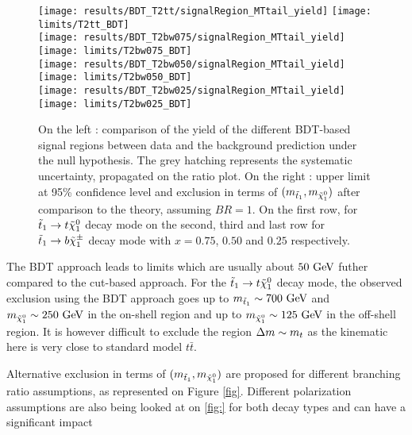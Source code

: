     \begin{figure}[h!]
        \centering
        \texttt{[image: results/BDT\_T2tt/signalRegion\_MTtail\_yield]}
        \texttt{[image: limits/T2tt\_BDT]}\\
        \texttt{[image: results/BDT\_T2bw075/signalRegion\_MTtail\_yield]}
        \texttt{[image: limits/T2bw075\_BDT]}\\
        \texttt{[image: results/BDT\_T2bw050/signalRegion\_MTtail\_yield]}
        \texttt{[image: limits/T2bw050\_BDT]}\\
        \texttt{[image: results/BDT\_T2bw025/signalRegion\_MTtail\_yield]}
        \texttt{[image: limits/T2bw025\_BDT]}\\
        \caption{On the left : comparison of the yield of the different BDT-based signal 
        regions between data and the background prediction under the null hypothesis. The
        grey hatching represents the systematic uncertainty, propagated on the ratio plot.
        On the right : upper limit at 95\% confidence level and exclusion in terms of 
        $(m_{\tilde{t}_1},m_{\tilde{\chi}_1^0})$ after comparison to the theory, assuming
        $BR = 1$. On the first row, for $\tilde{t}_1 \rightarrow t \tilde{\chi}_1^0$ decay mode on 
        the second, third and last row for $\tilde{t}_1 \rightarrow b \tilde{\chi}_1^\pm$ decay mode
        with $x=0.75$, $0.50$ and $0.25$ respectively.}
        \label{fig:resultsBDT}
    \end{figure}
     
    The BDT approach leads to limits which are usually about $50 ~\text{GeV}$ futher compared to 
    the cut-based approach. For the $\tilde{t}_1 \rightarrow t \tilde{\chi}_1^0$ decay mode, the 
    observed exclusion using the BDT approach goes up to $m_{\tilde{t}_1} \sim 700 ~\text{GeV}$ 
    and $m_{\tilde{\chi}_1^0} \sim 250 ~\text{GeV}$ in the on-shell region and up to 
    $m_{\tilde{\chi}_1^0} \sim 125 ~\text{GeV}$ in the off-shell region. It is however difficult 
    to exclude the region $\Delta m \sim m_{t}$ as the kinematic here is very close to 
    standard model $t\bar{t}$.


    Alternative exclusion in terms of $(m_{\tilde{t}_1}, m_{\tilde{\chi}_1^0})$ are proposed
    for different branching ratio assumptions, as represented on Figure \ref{fig}. 
    Different polarization assumptions are also being looked at on \ref{fig:} for both
    decay types and can have a significant impact 

